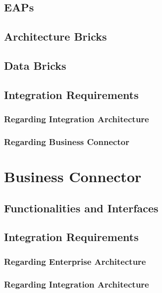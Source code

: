 \documentclass[
     12pt,         %
     a4paper,      %
     BCOR10mm,     %
     DIV14,        %
aragraph skip instad of paragraph indent
     ]{scrreprt}
\begin{document}
\subsection{EAPs}

\subsection{Architecture Bricks}

\subsection{Data Bricks}

\subsection{Integration Requirements}

\subsubsection{Regarding Integration Architecture}

\subsubsection{Regarding Business Connector}



\section{Business Connector}


\subsection{Functionalities and Interfaces}

\subsection{Integration Requirements}

\subsubsection{Regarding Enterprise Architecture}

\subsubsection{Regarding Integration Architecture}
\end{document}
